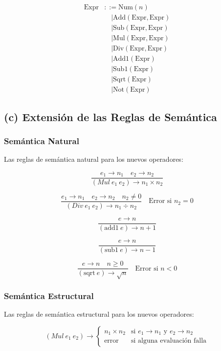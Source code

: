 \documentclass[12pt,letterpaper]{article}
\begin{document}
\[
\begin{aligned}
\text{Expr} &::= \text{Num}(n) \\
            &\quad | \text{Add}(\text{Expr}, \text{Expr}) \\
            &\quad | \text{Sub}(\text{Expr}, \text{Expr}) \\
            &\quad | \text{Mul}(\text{Expr}, \text{Expr}) \\
            &\quad | \text{Div}(\text{Expr}, \text{Expr}) \\
            &\quad | \text{Add1}(\text{Expr}) \\
            &\quad | \text{Sub1}(\text{Expr}) \\
            &\quad | \text{Sqrt}(\text{Expr}) \\
            &\quad | \text{Not}(\text{Expr})
\end{aligned}
\]

\subsection*{(c) Extensión de las Reglas de Semántica}

\subsubsection*{Semántica Natural}

Las reglas de semántica natural para los nuevos operadores:

\[
\frac{e_1 \rightarrow n_1 \quad e_2 \rightarrow n_2}{(Mul\ e_1\ e_2) \rightarrow n_1 \times n_2}
\]

\[
\frac{e_1 \rightarrow n_1 \quad e_2 \rightarrow n_2 \quad n_2 \neq 0}{(Div\ e_1\ e_2) \rightarrow n_1 \div n_2} \quad \text{Error si } n_2 = 0
\]

\[
\frac{e \rightarrow n}{(\text{add1}\ e) \rightarrow n + 1}
\]

\[
\frac{e \rightarrow n}{(\text{sub1}\ e) \rightarrow n - 1}
\]

\[
\frac{e \rightarrow n \quad n \geq 0}{(\text{sqrt}\ e) \rightarrow \sqrt{n}} \quad \text{Error si } n < 0
\]

\subsubsection*{Semántica Estructural}

Las reglas de semántica estructural para los nuevos operadores:

\[
(Mul\ e_1\ e_2) \rightarrow \begin{cases} 
n_1 \times n_2 & \text{si } e_1 \rightarrow n_1 \text{ y } e_2 \rightarrow n_2 \\
\text{error} & \text{si alguna evaluación falla}
\end{cases}
\]
\end{document}
